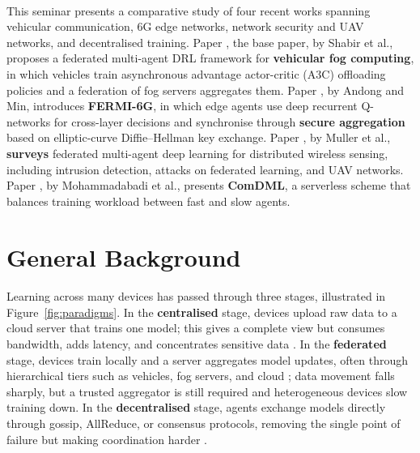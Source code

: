\documentclass[12pt,a4paper,final]{extreport}
\begin{document}
\paragraph{} This seminar presents a comparative study of four recent works spanning vehicular communication, 6G edge networks, network security and UAV networks, and decentralised training. Paper \cite{p1}, the base paper, by Shabir et al., proposes a federated multi-agent DRL framework for \textbf{vehicular fog computing}, in which vehicles train asynchronous advantage actor-critic (A3C) offloading policies and a federation of fog servers aggregates them. Paper \cite{p2}, by Andong and Min, introduces \textbf{FERMI-6G}, in which edge agents use deep recurrent Q-networks for cross-layer decisions and synchronise through \textbf{secure aggregation} based on elliptic-curve Diffie--Hellman key exchange. Paper \cite{p3}, by Muller et al., \textbf{surveys} federated multi-agent deep learning for distributed wireless sensing, including intrusion detection, attacks on federated learning, and UAV networks. Paper \cite{p4}, by Mohammadabadi et al., presents \textbf{ComDML}, a serverless scheme that balances training workload between fast and slow agents.

\section{General Background}

\paragraph{} Learning across many devices has passed through three stages, illustrated in Figure~\ref{fig:paradigms}. In the \textbf{centralised} stage, devices upload raw data to a cloud server that trains one model; this gives a complete view but consumes bandwidth, adds latency, and concentrates sensitive data \cite{p1}. In the \textbf{federated} stage, devices train locally and a server aggregates model updates, often through hierarchical tiers such as vehicles, fog servers, and cloud \cite{p1,p3}; data movement falls sharply, but a trusted aggregator is still required and heterogeneous devices slow training down. In the \textbf{decentralised} stage, agents exchange models directly through gossip, AllReduce, or consensus protocols, removing the single point of failure but making coordination harder \cite{p4}.
\end{document}
